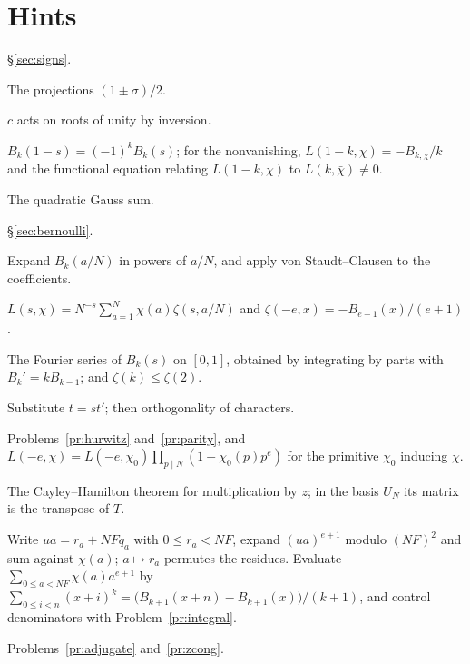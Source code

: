 \documentclass[reqno]{amsart}
\theoremstyle{definition}
\theoremstyle{plain}
\begin{document}
\section*{Hints}
{\small

\noindent\S\ref{sec:signs}.
\begin{description}\setlength{\itemsep}{0pt}
\item[\ref{pr:split}] The projections \((1\pm\sigma)/2\).
\item[\ref{pr:parts}] \(c\) acts on roots of unity by inversion.
\item[\ref{pr:parity}] \(B_k(1-s)=(-1)^kB_k(s)\); for the nonvanishing, \(L(1-k,\chi)=-B_{k,\chi}/k\) \cite[Thm.~4.2]{Wa} and the functional equation relating \(L(1-k,\chi)\) to \(L(k,\bar\chi)\ne0\).
\item[\ref{pr:degree}] The quadratic Gauss sum.
\end{description}

\noindent\S\ref{sec:bernoulli}.
\begin{description}\setlength{\itemsep}{0pt}
\item[\ref{pr:integral}] Expand \(B_k(a/N)\) in powers of \(a/N\), and apply von Staudt--Clausen to the coefficients.
\item[\ref{pr:hurwitz}] \(L(s,\chi)=N^{-s}\sum_{a=1}^N\chi(a)\zeta(s,a/N)\) and \(\zeta(-e,x)=-B_{e+1}(x)/(e+1)\) \cite[Ch.~4]{Wa}.
\item[\ref{pr:size}] The Fourier series of \(B_k(s)\) on \([0,1]\), obtained by integrating by parts with \(B_k'=kB_{k-1}\); and \(\zeta(k)\le\zeta(2)\).
\item[\ref{pr:matrix}] Substitute \(t=st'\); then orthogonality of characters.
\item[\ref{pr:eigen}] Problems~\ref{pr:hurwitz} and~\ref{pr:parity}, and \(L(-e,\chi)=L(-e,\chi_0)\prod_{p\mid N}(1-\chi_0(p)p^e)\) for the primitive \(\chi_0\) inducing \(\chi\).
\item[\ref{pr:adjugate}] The Cayley--Hamilton theorem for multiplication by \(z\); in the basis \(U_N\) its matrix is the transpose of \(T\).
\item[\ref{pr:zcong}] Write \(ua=r_a+NF q_a\) with \(0\le r_a<NF\), expand \((ua)^{e+1}\) modulo \((NF)^2\) and sum against \(\chi(a)\); \(a\mapsto r_a\) permutes the residues.  Evaluate \(\sum_{0\le a<NF}\chi(a)a^{e+1}\) by \(\sum_{0\le i<n}(x+i)^k=\bigl(B_{k+1}(x+n)-B_{k+1}(x)\bigr)/(k+1)\), and control denominators with Problem~\ref{pr:integral}.
\item[\ref{pr:witness}] Problems~\ref{pr:adjugate} and~\ref{pr:zcong}.
\end{description}

}
\end{document}
